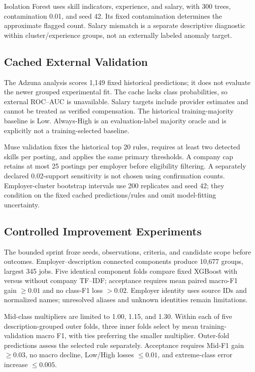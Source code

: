 \documentclass[sigconf,nonacm]{acmart}
\begin{document}
Isolation Forest uses skill indicators, experience, and salary, with 300 trees, contamination 0.01, and seed 42. Its fixed contamination determines the approximate flagged count. Salary mismatch is a separate descriptive diagnostic within cluster/experience groups, not an externally labeled anomaly target.

\subsection{Cached External Validation}
The Adzuna analysis scores 1,149 fixed historical predictions; it does not evaluate the newer grouped experimental fit. The cache lacks class probabilities, so external ROC--AUC is unavailable. Salary targets include provider estimates and cannot be treated as verified compensation. The historical training-majority baseline is Low. Always-High is an evaluation-label majority oracle and is explicitly not a training-selected baseline.

Muse validation fixes the historical top 20 rules, requires at least two detected skills per posting, and applies the same primary thresholds. A company cap retains at most 25 postings per employer before eligibility filtering. A separately declared 0.02-support sensitivity is not chosen using confirmation counts. Employer-cluster bootstrap intervals use 200 replicates and seed 42; they condition on the fixed cached predictions/rules and omit model-fitting uncertainty.

\subsection{Controlled Improvement Experiments}
The bounded sprint froze seeds, observations, criteria, and candidate scope before outcomes. Employer--description connected components produce 10,677 groups, largest 345 jobs. Five identical component folds compare fixed XGBoost with versus without company TF--IDF; acceptance requires mean paired macro-F1 gain $\geq0.01$ and no class-F1 loss $>0.02$. Employer identity uses source IDs and normalized names; unresolved aliases and unknown identities remain limitations.

Mid-class multipliers are limited to 1.00, 1.15, and 1.30. Within each of five description-grouped outer folds, three inner folds select by mean training-validation macro F1, with ties preferring the smaller multiplier. Outer-fold predictions assess the selected rule separately. Acceptance requires Mid-F1 gain $\geq0.03$, no macro decline, Low/High losses $\leq0.01$, and extreme-class error increase $\leq0.005$.
\end{document}
